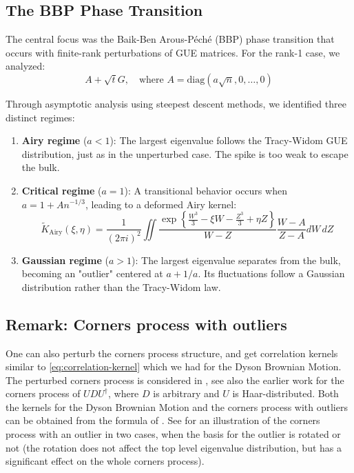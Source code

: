 \documentclass[letterpaper,11pt,oneside,reqno]{article}
\numberwithin{equation}{section}
\theoremstyle{definition}
\begin{document}
\subsection{The BBP Phase Transition}

The central focus was the Baik-Ben Arous-Péché (BBP) phase transition that occurs with finite-rank perturbations of GUE matrices. For the rank-1 case, we analyzed:
\begin{equation*}
A + \sqrt{t}G, \quad \text{where } A = \text{diag}(a\sqrt{n},0,\ldots,0)
\end{equation*}

Through asymptotic analysis using steepest descent methods, we identified three distinct regimes:

\begin{enumerate}
\item \textbf{Airy regime} ($a < 1$): The largest eigenvalue follows the Tracy-Widom GUE distribution, just as in the unperturbed case. The spike is too weak to escape the bulk.

\item \textbf{Critical regime} ($a = 1$): A transitional behavior occurs when $a = 1 + An^{-1/3}$, leading to a deformed Airy kernel:
\begin{equation*}
\tilde{K}_{\text{Airy}}(\xi,\eta) = \frac{1}{(2\pi i)^2}\iint \frac{\exp\left\{\frac{W^3}{3}-\xi W-\frac{Z^3}{3}+\eta Z\right\}}{W-Z} \frac{W-A}{Z-A} dW\,dZ
\end{equation*}

\item \textbf{Gaussian regime} ($a > 1$): The largest eigenvalue separates from the bulk, becoming an "outlier" centered at $a + 1/a$. Its fluctuations follow a Gaussian distribution rather than the Tracy-Widom law.
\end{enumerate}


\subsection{Remark: Corners process with outliers}

One can also perturb the corners process structure, and get
correlation kernels similar to \eqref{eq:correlation-kernel}
which we had for the Dyson Brownian Motion.
The perturbed corners process is
considered in \cite{Ferrari2014PerturbedGUE},
see also the earlier work \cite{Metcalfe2011GT}
for the corners process of $UDU^\dagger$, where $D$ is arbitrary and
$U$ is Haar-distributed. Both the kernels
for the Dyson Brownian Motion and the corners process
with outliers can be obtained from the formula of
\cite{Metcalfe2011GT}.
See  for an illustration of the corners process with an outlier
in two cases, when the basis for the outlier is rotated or not
(the rotation does not affect the top level eigenvalue distribution,
but has a significant effect on the whole corners process).
\end{document}
